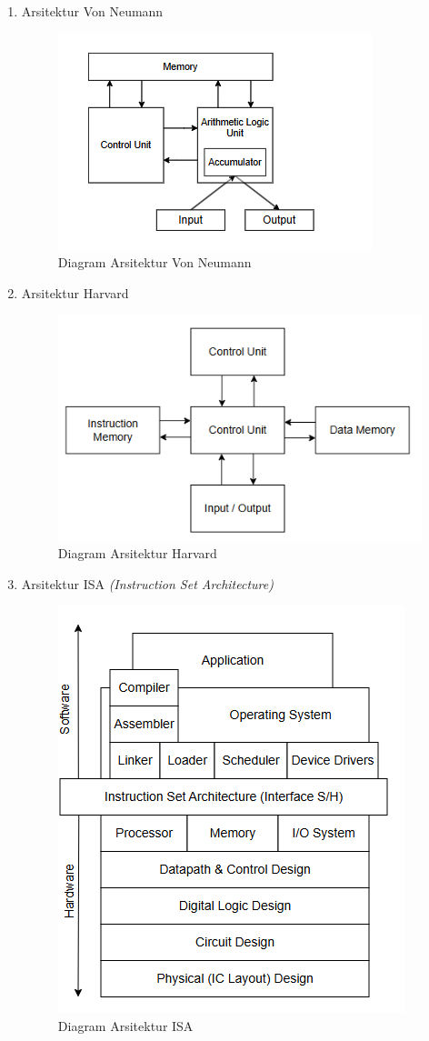 \documentclass[12pt]{article}
\begin{document}
\begin{enumerate}
    \item Arsitektur Von Neumann

        \noindent
        \begin{figure}[H]
            \centering
            \includegraphics[width=0.6\linewidth]{asset/image1.png}
            \caption{Diagram Arsitektur Von Neumann}
            \label{fig:Arsitektur-Von-Neumann}
        \end{figure}

    
    \item Arsitektur Harvard

        \noindent
        \begin{figure}[H]
            \centering
            \includegraphics[width=0.6\linewidth]{asset/image2.png}
            \caption{Diagram Arsitektur Harvard}
            \label{fig:Diagram-Arsitektur-Harvard}
        \end{figure}
    


    \item Arsitektur ISA \textit{(Instruction Set Architecture)}

        \noindent
        \begin{figure}[H]
            \centering
            \includegraphics[width=0.3\linewidth]{asset/image3.png}
            \caption{Diagram Arsitektur ISA}
            \label{fig:Diagram-Arsitektur-ISA}
        \end{figure}


\end{enumerate}
\end{document}
